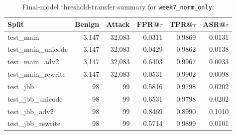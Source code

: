 \begin{table}[t]
\centering
\caption{Final-model threshold-transfer summary for \texttt{week7\_norm\_only}.}
\label{tab:threshold_transfer_summary}
\begin{tabular}{lrrrrr}
\toprule
Split & Benign & Attack & FPR@$\tau$ & TPR@$\tau$ & ASR@$\tau$ \\
\midrule
test\_main & 3,147 & 32,083 & 0.0311 & 0.9869 & 0.0131 \\
test\_main\_unicode & 3,147 & 32,083 & 0.0429 & 0.9862 & 0.0138 \\
test\_main\_adv2 & 3,147 & 32,083 & 0.6403 & 0.9967 & 0.0033 \\
test\_main\_rewrite & 3,147 & 32,083 & 0.0531 & 0.9902 & 0.0098 \\
test\_jbb & 98 & 99 & 0.5816 & 0.9798 & 0.0202 \\
test\_jbb\_unicode & 98 & 99 & 0.6531 & 0.9798 & 0.0202 \\
test\_jbb\_adv2 & 98 & 99 & 0.8469 & 0.8990 & 0.1010 \\
test\_jbb\_rewrite & 98 & 99 & 0.5714 & 0.9899 & 0.0101 \\
\bottomrule
\end{tabular}
\end{table}